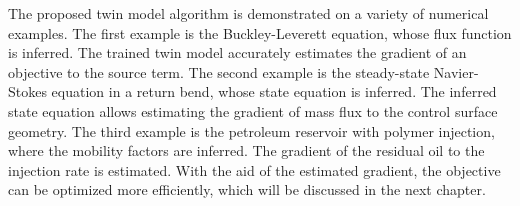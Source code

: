 The proposed twin model algorithm is demonstrated on 
a variety of numerical examples. The first example is the Buckley-Leverett equation,
whose flux function is inferred. The trained twin model accurately estimates 
the gradient of an objective to the source term. 
The second example is the steady-state Navier-Stokes equation in a return bend,
whose state equation is inferred. The inferred state equation allows 
estimating the gradient of mass flux to the control surface geometry.
The third example is the petroleum reservoir with polymer injection, where
the mobility factors are inferred. The gradient of the residual oil to
the injection rate is estimated.
With the aid of the estimated gradient, the objective can be optimized more efficiently,
which will be discussed in the next chapter.

